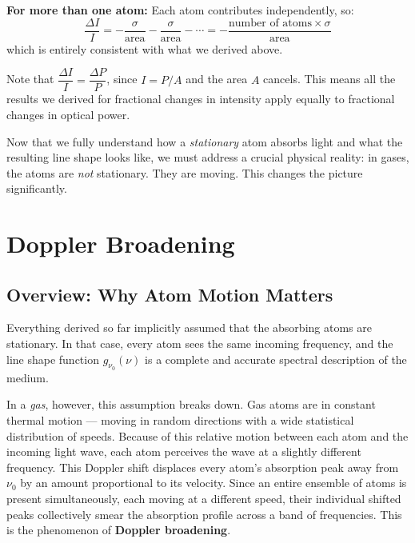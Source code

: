 \textbf{For more than one atom:} Each atom contributes independently, so:
\begin{equation*}
    \frac{\Delta I}{I} = -\frac{\sigma}{\text{area}} - \frac{\sigma}{\text{area}} - \cdots = -\frac{\text{number of atoms} \times \sigma}{\text{area}}
\end{equation*}
which is entirely consistent with what we derived above.

\begin{keyinsight}
    Note that $\dfrac{\Delta I}{I} = \dfrac{\Delta P}{P}$, since $I = P/A$ and the area $A$ cancels. This means all the results we derived for fractional changes in intensity apply equally to fractional changes in optical power.
\end{keyinsight}

Now that we fully understand how a \emph{stationary} atom absorbs light and what the resulting line shape looks like, we must address a crucial physical reality: in gases, the atoms are \emph{not} stationary. They are moving. This changes the picture significantly.

\section{Doppler Broadening}

\subsection{Overview: Why Atom Motion Matters}

Everything derived so far implicitly assumed that the absorbing atoms are stationary. In that case, every atom sees the same incoming frequency, and the line shape function $g_{\nu_0}(\nu)$ is a complete and accurate spectral description of the medium.

In a \emph{gas}, however, this assumption breaks down. Gas atoms are in constant thermal motion — moving in random directions with a wide statistical distribution of speeds. Because of this relative motion between each atom and the incoming light wave, each atom perceives the wave at a slightly different frequency. This Doppler shift displaces every atom's absorption peak away from $\nu_0$ by an amount proportional to its velocity. Since an entire ensemble of atoms is present simultaneously, each moving at a different speed, their individual shifted peaks collectively smear the absorption profile across a band of frequencies. This is the phenomenon of \textbf{Doppler broadening}.

